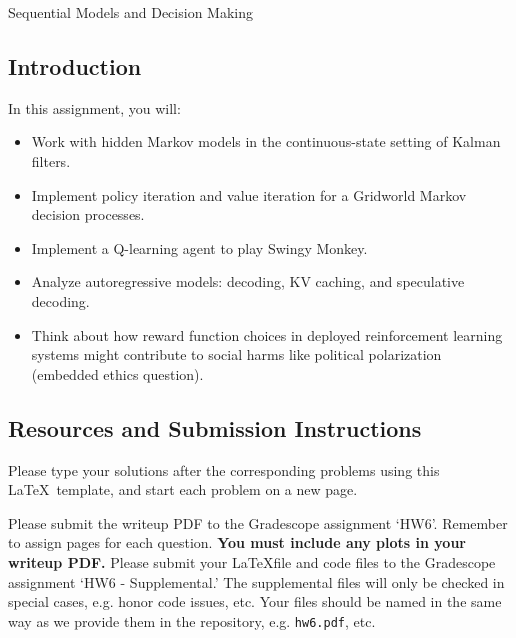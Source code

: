 \documentclass[submit]{harvardml}
\begin{document}
\begin{center}
{\Large Sequential Models and Decision Making}\\


\end{center}

\subsection*{Introduction}

In this assignment, you will:
\begin{itemize}
    \item Work with hidden Markov models in the continuous-state setting of Kalman filters.
    \item Implement policy iteration and value iteration for a Gridworld Markov decision processes.
    \item Implement a Q-learning agent to play Swingy Monkey.
    \item Analyze autoregressive models: decoding, KV caching, and speculative decoding.
    \item Think about how reward function choices in deployed reinforcement learning systems might contribute to social harms like political polarization (embedded ethics question).
\end{itemize}

\subsection*{Resources and Submission Instructions}

Please type your solutions after the corresponding problems using this \LaTeX\ template, and start each problem on a new page.

Please submit the writeup PDF to the Gradescope assignment `HW6'. Remember to assign pages for each question.  \textbf{You must include any plots in your writeup PDF.} Please submit your \LaTeX file and code files to the Gradescope assignment `HW6 - Supplemental.' The supplemental files will only be checked in special cases, e.g. honor code issues, etc. Your files should be named in the same way as we provide them in the repository, e.g. \texttt{hw6.pdf}, etc.
\\

\newpage
\end{document}
